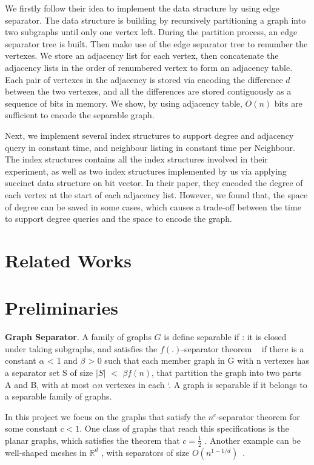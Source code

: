 \documentclass[12pt,glossary]{dalthesis}
\begin{document}
We firstly follow their idea to implement the data structure by using edge separator. The data structure is building by recursively partitioning a graph into two subgraphs until only one vertex left. During the partition process, an edge separator tree is built. Then make use of the edge separator tree to renumber the vertexes. We store an adjacency list for each vertex, then concatenate the adjacency lists in the order of renumbered vertex to form an adjacency table. Each pair of vertexes in the adjacency is stored via encoding the difference $d$ between the two vertexes, and all the differences are stored contiguously as a sequence of bits in memory. We show, by using adjacency table, $O(n)$ bits are sufficient to encode the separable graph.

Next, we implement several index structures to support degree and adjacency query in
constant time, and neighbour listing in constant time per Neighbour. The index structures contains all the index structures involved in their experiment, as well as two index structures implemented by us via applying succinct data structure on bit vector. In their paper, they encoded the degree of each vertex at the start of each adjacency list. However, we found that, the space of degree can be saved in some cases, which causes a trade-off between the time to support degree queries and the space to encode the graph.

\section{Related Works}


\section{Preliminaries}

\textbf{Graph Separator}. A family of graphs $G$ is define separable if : it is closed under taking subgraphs, and satisfies the $f(.)$-separator theorem ~\cite{separator-theorem} if there is a constant $\alpha$ < 1 and $\beta$ > 0 such that each member graph in G with n vertexes has a separator set S of size $|S|$ $<$ $\beta f(n)$, that partition the graph into two parts A and B, with at most $\alpha n$ vertexes in each `\cite{separator-theorem}. A graph is separable if it belongs to a separable family of graphs. 

In this project we focus on the graphs that satisfy the $n^{c}$-separator theorem for some constant $c < 1$. One class of graphs that reach this specifications is the planar graphs, which satisfies the theorem that $c = \frac{1}{2}$ . Another example can be well-shaped meshes in $\mathbb{R}^{d}$ , with separators of size $O(n^{1-1/d})$~\cite{ separators-sphere-packing}.
\end{document}
